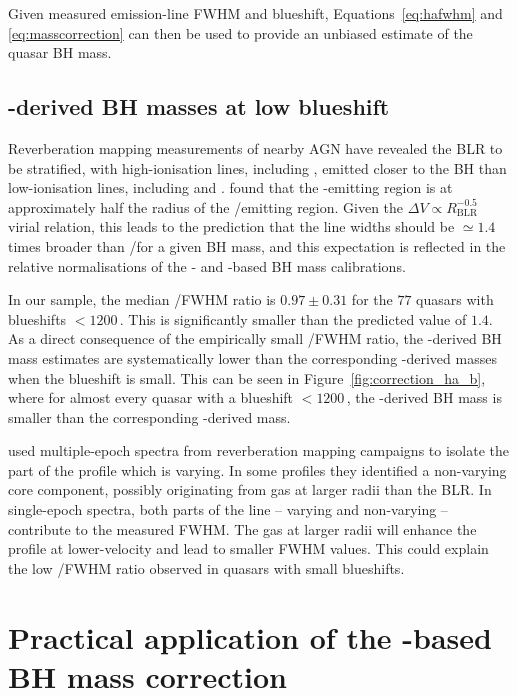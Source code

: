 \noindent Given measured  emission-line FWHM and blueshift, Equations~\ref{eq:hafwhm} and \ref{eq:masscorrection} can then be used to provide an unbiased estimate of the quasar BH mass.

\subsection{-derived BH masses at low  blueshift}

Reverberation mapping measurements of nearby AGN have revealed the BLR to be stratified, with high-ionisation lines, including , emitted closer to the BH than low-ionisation lines, including \ha and \hb \citep[e.g.][]{onken02}.
\citet{vestergaard06} found that the -emitting region is at approximately half the radius of the \hbns/\ha emitting region.
Given the $\Delta V \propto R_{\text{BLR}}^{-0.5}$ virial relation, this leads to the prediction that the  line widths should be $\simeq 1.4$ times broader than \hans/\hb for a given BH mass, and this expectation is reflected in the relative normalisations of the \citet{vestergaard06} - and \hbns-based BH mass calibrations.

In our sample, the median /\ha FWHM ratio is $0.97 \pm 0.31$ for the $77$ quasars with  blueshifts $<1200$\,\kms.
This is significantly smaller than the predicted value of $1.4$. 
As a direct consequence of the empirically small /\ha FWHM ratio, the -derived BH mass estimates are systematically lower than the corresponding \hans-derived masses when the blueshift is small.
This can be seen in Figure~\ref{fig:correction_ha_b}, where for almost every quasar with a  blueshift $<$$1200$\,\kms, the -derived BH mass is smaller than the corresponding \hans-derived mass.

\citet{denney12} used multiple-epoch spectra from reverberation mapping campaigns to isolate the part of the  profile which is varying.
In some profiles they identified a non-varying core component, possibly originating from gas at larger radii than the BLR. 
In single-epoch spectra, both parts of the line -- varying and non-varying -- contribute to the measured FWHM. 
The gas at larger radii will enhance the profile at lower-velocity and lead to smaller FWHM values.
This could explain the low /\ha FWHM ratio observed in quasars with small  blueshifts. 

\section{Practical application of the -based BH mass correction}

